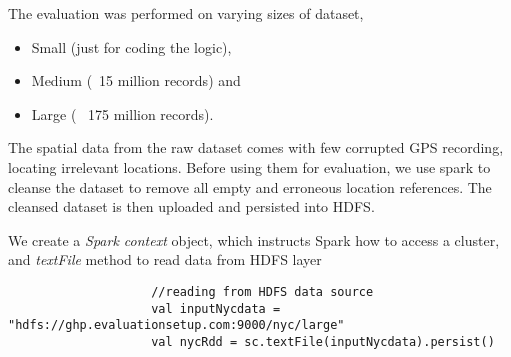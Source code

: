 \documentclass[article,type=msc,colorback,12pt,accentcolor=tud1d]{tudthesis}
\begin{document}
			  		  
			  		  The evaluation was performed on varying sizes of dataset, 
			  		  \begin{itemize}
			  		  	\item Small (just for coding the logic), 
			  		  	\item Medium (~15 million records) and 
			  		  	\item Large (~ 175 million records). 
			  		  \end{itemize}
			  
			  
			  The spatial data from the raw dataset comes with few corrupted GPS recording, locating irrelevant locations. Before using them for evaluation, we use spark to cleanse the dataset to remove all empty and erroneous location references. The cleansed dataset is then uploaded and persisted into HDFS. 
			  
			  We create a \textit{Spark context} object, which instructs Spark how to access a cluster,  and \textit{textFile} method to read data from HDFS layer
			  
			  \begin{lstlisting}
					//reading from HDFS data source
					val inputNycdata = "hdfs://ghp.evaluationsetup.com:9000/nyc/large"
				  	val nycRdd = sc.textFile(inputNycdata).persist()		  	
			  \end{lstlisting}
 
\end{document}
